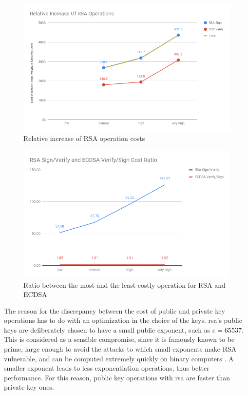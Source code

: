 \documentclass{llncs}
\begin{document}
\begin{figure}
  \centering
  \includegraphics[width=1.0\textwidth]{img/rsa_relative_increase.png}
  \caption{\label{fig:rsa-pub-priv-cost-increase} Relative increase of RSA operation costs}
\end{figure}

\begin{figure}
  \centering
  \includegraphics[width=1.0\textwidth]{img/rsa_ecdsa_operation_ratio.png}
  \caption{\label{fig:rsa-ecdsa-pub-priv-ratio} Ratio between the most and the least costly operation for RSA and ECDSA}
\end{figure}

The reason for the discrepancy between the cost of public and private key operations has to do with an optimization
in the choice of the keys. \gls{rsa}'s public keys are deliberately chosen to have a small public exponent, such as $e=65537$. This is considered as a
sensible compromise, since it is famously known to be prime, large enough to avoid the attacks to which 
small exponents make RSA vulnerable, and can be computed extremely quickly on binary computers \cite{boneh2002fast}\cite{muir2006seifert}.
A smaller exponent leads to less exponentiation operations, thus better performance. For this reason, public
key operations with \gls{rsa} are faster than private key ones.
\end{document}

